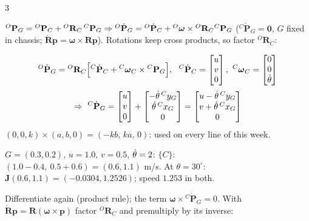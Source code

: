 \begin{multicols}{3}
\nopagebreak[4]
\begin{deriv}[velocity \pg{19--20}]
${}^O\mathbf P_G={}^O\mathbf P_C+{}^O\mathbf R_C\,{}^{C}\mathbf P_G\Rightarrow{}^O\dot{\mathbf P}_G={}^O\dot{\mathbf P}_C+{}^O\boldsymbol\omega\times{}^O\mathbf R_C{}^{C}\mathbf P_G$ (${}^C\dot{\mathbf P}_G=\mathbf 0$, $G$ fixed in chassis; $\dot{\mathbf R}\mathbf p=\boldsymbol\omega\times\mathbf R\mathbf p$). Rotations keep cross products, so factor ${}^O\mathbf R_C$:
\end{deriv}
\begin{fbx}[Velocity of $G$ \pg{19--20}]
\[{}^O\dot{\mathbf P}_G={}^O\mathbf R_C\Big[{}^C\dot{\mathbf P}_C+{}^C\boldsymbol\omega_C\times\wEPG\Big],\ \ {}^C\dot{\mathbf P}_C=\begin{bmatrix}u\\v\\0\end{bmatrix},\ {}^C\boldsymbol\omega_C=\begin{bmatrix}0\\0\\\wEth\end{bmatrix}\]
\[\Rightarrow\ {}^C\dot{\mathbf P}_G=\begin{bmatrix}u\\v\\0\end{bmatrix}+\begin{bmatrix}-\dot\theta\,{}^Cy_G\\\dot\theta\,{}^Cx_G\\0\end{bmatrix}=\begin{bmatrix}u-\dot\theta\,{}^Cy_G\\v+\dot\theta\,{}^Cx_G\\0\end{bmatrix}\]
$(0,0,k)\times(a,b,0)=(-kb,\,ka,\,0)$: used on every line of this week.
\end{fbx}
\begin{worked}
$G=(0.3,0.2)$, $u=1.0$, $v=0.5$, $\dot\theta=2$: $\{C\}$: $(1.0-0.4,\ 0.5+0.6)=(\mathbf{0.6},\mathbf{1.1})$ m/s. At $\theta=30^\circ$: $\mathbf J(0.6,1.1)=(\mathbf{-0.0304},\mathbf{1.2526})$; speed $1.253$ in both. \chk
\end{worked}
\begin{deriv}[acceleration \pg{22}]
Differentiate again (product rule); the term $\boldsymbol\omega\times{}^C\dot{\mathbf P}_G=0$. With $\dot{\mathbf R}\mathbf p=\mathbf R(\boldsymbol\omega\times\mathbf p)$ factor ${}^O\mathbf R_C$ and premultiply by its inverse:

\end{deriv}
\end{multicols}
